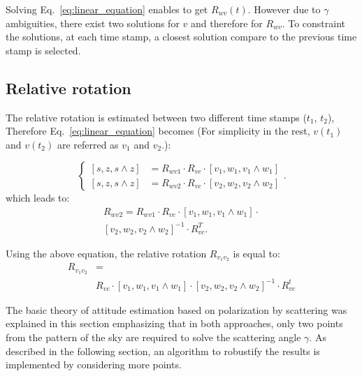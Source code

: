 Solving Eq.~\ref{eq:linear_equation} enables to get $R_{wv}(t)$. However due to
$\gamma$ ambiguities, there exist two solutions for $v$ and therefore for
$R_{wv}$.
To constraint the solutions, at each time stamp, a closest solution compare to
the previous time stamp is selected.



\subsection{Relative rotation}
\label{sec:rel-rot}

The relative rotation is estimated between two different time stamps ($t_1$,
$t_2$), Therefore Eq.~\ref{eq:linear_equation} becomes (For simplicity in the
rest, $v(t_1)$ and $v(t_2)$ are referred as $v_1$ and $v_2$.):

\begin{equation}
\begin{cases}
\left[s,z,s\wedge z\right] & =R_{wv1}\cdot R_{vc}\cdot\left[v_{1},w_{1},v_{1}\wedge w_{1}\right]\\
\left[s,z,s\wedge z\right] & =R_{wv2}\cdot R_{vc}\cdot\left[v_{2},w_{2},v_{2}\wedge w_{2}\right]
\end{cases}.
\label{eq:rel-linear_equation}
\end{equation}
\noindent which leads to:
\begin{equation}
  \begin{split}
R_{wv2}=R_{wv1}\cdot R_{vc}\cdot\left[v_{1},w_{1},v_{1}\wedge
  w_{1}\right]\cdot \\
\left[v_{2},w_{2},v_{2}\wedge w_{2}\right]^{-1} \cdot R_{vc}^{T}.
\label{eq:relative_equation}\end{split}
\end{equation}

Using the above equation, the relative rotation $R_{v_{1}v_{2}}$ is equal to:
\begin{equation}
\begin{split}
  R_{v_{1}v_{2}} &= \\
   & R_{vc}\cdot\left[v_{1},w_{1},v_{1}\wedge
  w_{1}\right]\cdot\left[v_{2},w_{2},v_{2}\wedge w_{2}\right]^{-1}\cdot
R_{vc}^{t}
\end{split}
\label{eq:final-relative}
\end{equation}


The basic theory of attitude estimation based on polarization by scattering was explained in this
section emphasizing that in both approaches, only two points from the pattern of the sky are required
to solve the scattering angle $\gamma$. As described in the following section, an algorithm to robustify
the results is implemented by considering more points.





